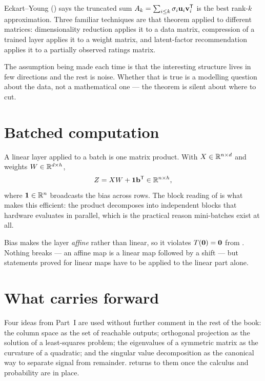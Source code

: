 Eckart--Young () says the truncated sum
\(A_k=\sum_{i\le k}\sigma_i\mathbf{u}_i\mathbf{v}_i^{\mathsf{T}}\) is the best rank-\(k\)
approximation. Three familiar techniques are that theorem applied to different
matrices: dimensionality reduction applies it to a data matrix, compression of a
trained layer applies it to a weight matrix, and latent-factor recommendation
applies it to a partially observed ratings matrix.

\begin{remark}
The assumption being made each time is that the interesting structure lives in
few directions and the rest is noise. Whether that is true is a modelling
question about the data, not a mathematical one --- the theorem is silent about
where to cut.
\end{remark}

\section{Batched computation}

A linear layer applied to a batch is one matrix product. With \(X\in\mathbb{R}^{n\times d}\)
and weights \(W\in\mathbb{R}^{d\times h}\),
\[
	Z=XW+\mathbf{1}\mathbf{b}^{\mathsf{T}}\in\mathbb{R}^{n\times h},
\]
where \(\mathbf{1}\in\mathbb{R}^{n}\) broadcasts the bias across rows. The block reading of
 is what makes this efficient: the product decomposes into
independent blocks that hardware evaluates in parallel, which is the practical
reason mini-batches exist at all.

\begin{remark}
Bias makes the layer \emph{affine} rather than linear, so it violates
\(T(\mathbf{0})=\mathbf{0}\) from . Nothing breaks --- an affine
map is a linear map followed by a shift --- but statements proved for linear
maps have to be applied to the linear part alone.
\end{remark}

\section{What carries forward}

Four ideas from Part~I are used without further comment in the rest of the book:
the column space as the set of reachable outputs; orthogonal projection as the
solution of a least-squares problem; the eigenvalues of a symmetric matrix as
the curvature of a quadratic; and the singular value decomposition as the
canonical way to separate signal from remainder. 
returns to them once the calculus and probability are in place.
